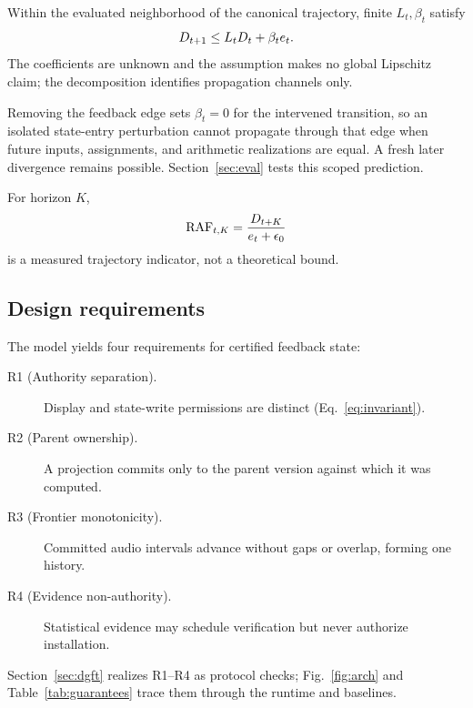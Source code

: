 \begin{assumption}\label{ass:local}
Within the evaluated neighborhood of the canonical trajectory, finite
$L_t,\beta_t$ satisfy
\begin{equation}\label{eq:recurrence}
  D_{t+1}\le L_tD_t+\beta_te_t.
\end{equation}
The coefficients are unknown and the assumption makes no global Lipschitz
claim; the decomposition identifies propagation channels only.
\end{assumption}

\begin{remark}\label{rem:causal}
Removing the feedback edge sets $\beta_t=0$ for the intervened transition, so
an isolated state-entry perturbation cannot propagate through that edge when
future inputs, assignments, and arithmetic realizations are equal. A fresh
later divergence remains possible. Section~\ref{sec:eval} tests this scoped
prediction.
\end{remark}

\begin{definition}\label{def:raf}
For horizon $K$,
\[
  \mathrm{RAF}_{t,K}=\frac{D_{t+K}}{e_t+\epsilon_0}
\]
is a measured trajectory indicator, not a theoretical bound.
\end{definition}

\subsection{Design requirements}\label{sec:model:reqs}

The model yields four requirements for certified feedback state:
\begin{description}
  \item[R1 (Authority separation).] Display and state-write permissions are
    distinct (Eq.~\eqref{eq:invariant}).
  \item[R2 (Parent ownership).] A projection commits only to the parent
    version against which it was computed.
  \item[R3 (Frontier monotonicity).] Committed audio intervals advance without
    gaps or overlap, forming one history.
  \item[R4 (Evidence non-authority).] Statistical evidence may schedule
    verification but never authorize installation.
\end{description}
Section~\ref{sec:dgft} realizes R1--R4 as protocol checks; Fig.~\ref{fig:arch}
and Table~\ref{tab:guarantees} trace them through the runtime and baselines.
